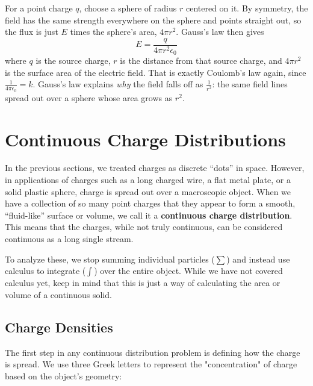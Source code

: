 For a point charge $q$, choose a sphere of radius $r$ centered on it. By
symmetry, the field has the same strength everywhere on the sphere and
points straight out, so the flux is just $E$ times the sphere's area,
$4\pi r^2$. Gauss's law then gives
\begin{equation}
	E = \frac{q}{4\pi r^2\epsilon_0}
\end{equation}
where $q$ is the source charge, $r$ is the distance from that source charge, and $4\pi r^2$ is the surface area of the electric field. 
That is exactly Coulomb's law again, since $\frac{1}{4\pi\epsilon_0} = k$.
Gauss's law explains \emph{why} the field falls off as $\frac{1}{r^2}$: the
same field lines spread out over a sphere whose area grows as $r^2$.
\section{Continuous Charge Distributions}
In the previous sections, we treated charges as discrete ``dots'' in space. However, in applications of charges such as a long charged wire, a flat metal plate, or a solid plastic sphere, charge is spread out over a macroscopic object. When we have a collection of so many point charges that they appear to form a smooth, ``fluid-like'' surface or volume, we call it a \textbf{continuous charge distribution}. This means that the charges, while not truly continuous, can be considered continuous as a long single stream.

To analyze these, we stop summing individual particles ($\sum$) and instead use calculus to integrate ($\int$) over the entire object. While we have not covered calculus yet, keep in mind that this is just a way of calculating the area or volume of a continuous solid.
\subsection{Charge Densities}
The first step in any continuous distribution problem is defining how the charge is spread. We use three Greek letters to represent the "concentration" of charge based on the object's geometry:

